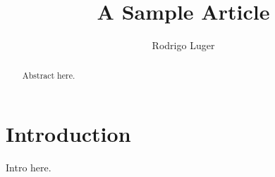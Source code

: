 \documentclass[modern]{aastex62}
\begin{document}
\title{A Sample Article}

\author[0000-0002-0296-3826]{Rodrigo Luger}

\begin{abstract}
    Abstract here.
    \href{https://github.com/rodluger/paparazzi}{\color{linkcolor}\faGithub}
\end{abstract}

\section{Introduction}
Intro here.

\clearpage

\end{document}

